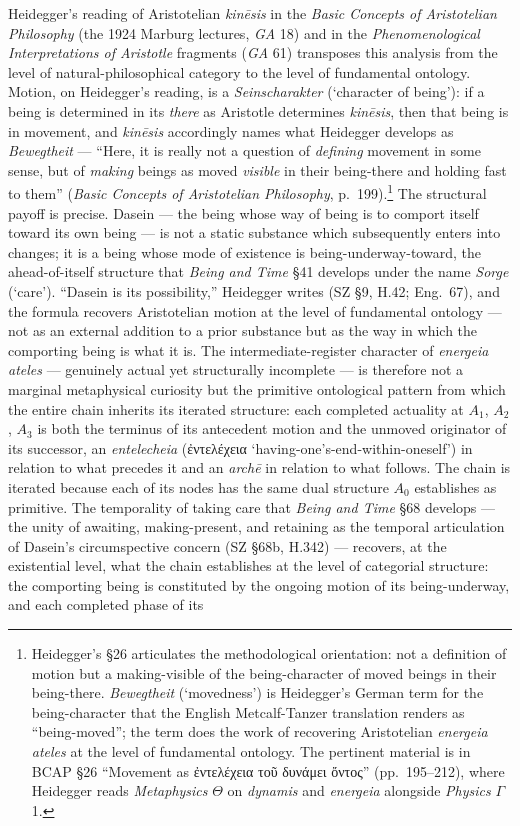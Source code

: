 \documentclass{article}
\newcommand{\gk}[1]{{\greekfont #1}}
\begin{document}
Heidegger's reading of Aristotelian \textit{kinēsis} in the \textit{Basic Concepts of Aristotelian Philosophy} (the 1924 Marburg lectures, \textit{GA} 18) and in the \textit{Phenomenological Interpretations of Aristotle} fragments (\textit{GA} 61) transposes this analysis from the level of natural-philosophical category to the level of fundamental ontology. Motion, on Heidegger's reading, is a \textit{Seinscharakter} (`character of being'): if a being is determined in its \textit{there} as Aristotle determines \textit{kinēsis}, then that being is in movement, and \textit{kinēsis} accordingly names what Heidegger develops as \textit{Bewegtheit} --- ``Here, it is really not a question of \textit{defining} movement in some sense, but of \textit{making} beings as moved \textit{visible} in their being-there and holding fast to them'' (\textit{Basic Concepts of Aristotelian Philosophy}, p.~199).\footnote{Heidegger's \S 26 articulates the methodological orientation: not a definition of motion but a making-visible of the being-character of moved beings in their being-there. \textit{Bewegtheit} (`movedness') is Heidegger's German term for the being-character that the English Metcalf-Tanzer translation renders as ``being-moved''; the term does the work of recovering Aristotelian \textit{energeia ateles} at the level of fundamental ontology. The pertinent material is in BCAP \S 26 ``Movement as \gk{ἐντελέχεια τοῦ δυνάμει ὄντος}'' (pp.~195--212), where Heidegger reads \textit{Metaphysics} $\Theta$ on \textit{dynamis} and \textit{energeia} alongside \textit{Physics} $\Gamma$ 1.} The structural payoff is precise. Dasein --- the being whose way of being is to comport itself toward its own being --- is not a static substance which subsequently enters into changes; it is a being whose mode of existence is being-underway-toward, the ahead-of-itself structure that \textit{Being and Time} \S 41 develops under the name \textit{Sorge} (`care'). ``Dasein is its possibility,'' Heidegger writes (SZ \S 9, H.42; Eng.~67), and the formula recovers Aristotelian motion at the level of fundamental ontology --- not as an external addition to a prior substance but as the way in which the comporting being is what it is. The intermediate-register character of \textit{energeia ateles} --- genuinely actual yet structurally incomplete --- is therefore not a marginal metaphysical curiosity but the primitive ontological pattern from which the entire chain inherits its iterated structure: each completed actuality at $A_1$, $A_2$, $A_3$ is both the terminus of its antecedent motion and the unmoved originator of its successor, an \textit{entelecheia} (\gk{ἐντελέχεια} `having-one's-end-within-oneself') in relation to what precedes it and an \textit{archē} in relation to what follows. The chain is iterated because each of its nodes has the same dual structure $A_0$ establishes as primitive. The temporality of taking care that \textit{Being and Time} \S 68 develops --- the unity of awaiting, making-present, and retaining as the temporal articulation of Dasein's circumspective concern (SZ \S 68b, H.342) --- recovers, at the existential level, what the chain establishes at the level of categorial structure: the comporting being is constituted by the ongoing motion of its being-underway, and each completed phase of its 
\end{document}
